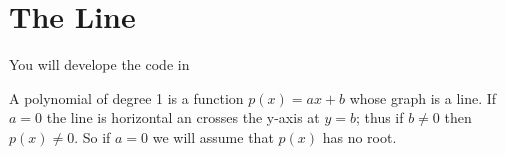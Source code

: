 \section{The Line}
\label{sec.line}

You will develope the code in 


A polynomial of degree 1 is a function $p(x)=a x + b$ whose graph is a line.   If $a=0$ the
line is horizontal an crosses the y-axis at $y=b$; thus if $b\neq 0$ then $p(x)\neq 0$.
So if $a=0$ we will assume that $p(x)$ has no root.   

